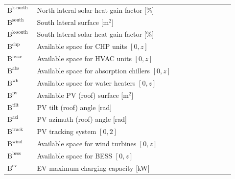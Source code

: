 \documentclass[11pt]{article}
\begin{document}
\begin{center}
\begin{tabular}{p{0.12\linewidth}p{0.8\linewidth}}
\(\text{B}^\text{k-north}\) & North lateral solar heat gain factor [\%] \\
\(\text{B}^\text{south}\) & South lateral surface [m\(^2\)] \\
\(\text{B}^\text{k-south}\) & South lateral solar heat gain factor [\%] \\
\(\text{B}^\text{chp}\) & Available space for CHP units \([0,z]\) \\
\(\text{B}^\text{hvac}\) & Available space for HVAC units \([0,z]\) \\
\(\text{B}^\text{abs}\) & Available space for absorption chillers \([0,z]\) \\
\(\text{B}^\text{wh}\) & Available space for water heaters \([0,z]\) \\
\(\text{B}^\text{pv}\) & Available PV (roof) surface [m\(^2\)] \\
\(\text{B}^\text{tilt}\) & PV tilt (roof) angle [rad] \\
\(\text{B}^\text{azi}\) & PV azimuth (roof) angle [rad] \\
\(\text{B}^\text{track}\) & PV tracking system \([0, 2]\) \\
\(\text{B}^\text{wind}\) & Available space for wind turbines \([0,z]\) \\
\(\text{B}^\text{bess}\) & Available space for BESS \([0,z]\) \\
\(\text{B}^\text{ev}\) & EV maximum charging capacity [kW] \\
\hline
\end{tabular}
\captionsetup{type=table}
\label{tab:building_parameters}
\end{center}
\end{document}
